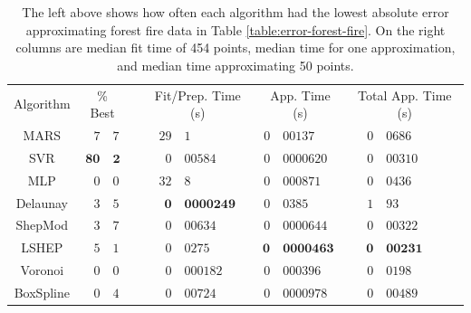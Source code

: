 \documentclass[smallextended,final]{svjour3}  %
\begin{document}
\begin{appendix}
\begin{table}[H]
  \centering
  \begin{tabular}{|c|r@{.}l| c |r@{.}l|r@{.}l|r@{.}l|}
    \cline{1-3}\cline{5-10}
    Algorithm & \multicolumn{2}{c|}{\% Best} &  & \multicolumn{2}{c|}{Fit/Prep. Time (s)} & \multicolumn{2}{c|}{App. Time (s)} & \multicolumn{2}{c|}{Total App. Time (s)}\\
    \cline{1-3}\cline{5-10}
    MARS & \quad$\mathit{7}$&$\mathit{7}$ &  & \quad\,\,\,$29$&$1$ & \quad$0$&$00137$ & \quad\quad\quad$0$&$0686$\\
    SVR & $\mathbf{80}$&$\mathbf{2}$ &  & $0$&$00584$ & $\mathit{0}$&$\mathit{0000620}$ & $\mathit{0}$&$\mathit{00310}$\\
    MLP & $0$&$0$ &  & $32$&$8$ & $0$&$000871$ & $0$&$0436$\\
    Delaunay & $3$&$5$ &  & $\mathbf{0}$&$\mathbf{0000249}$ & $0$&$0385$ & $1$&$93$\\
    ShepMod & $3$&$7$ &  & $0$&$00634$ & $0$&$0000644$ & $0$&$00322$\\
    LSHEP & $5$&$1$ &  & $0$&$0275$ & $\mathbf{0}$&$\mathbf{0000463}$ & $\mathbf{0}$&$\mathbf{00231}$\\
    Voronoi & $0$&$0$ &  & $\mathit{0}$&$\mathit{000182}$ & $0$&$000396$ & $0$&$0198$\\
    BoxSpline & $0$&$4$ &  & $0$&$00724$ & $0$&$0000978$ & $0$&$00489$\\
    \cline{1-3}\cline{5-10}
  \end{tabular}
  \caption{The left above shows how often each algorithm had the
    lowest absolute error approximating forest fire data in Table
    \ref{table:error-forest-fire}. On the right columns are median fit
    time of 454 points, median time for one approximation, and median
    time approximating 50 points.}
  \label{table:best-forest-fire}
\end{table}

\vspace*{\fill}
\newpage


\end{appendix}
\end{document}
